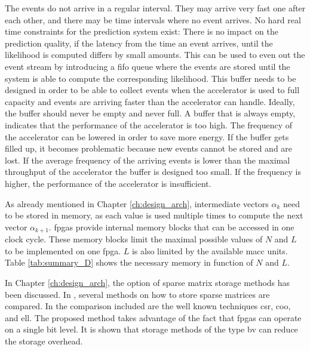 \documentclass[mscthesis]{usiinfthesis}
\begin{document}
The events do not arrive in a regular interval. They may arrive very fast one
after each other, and there may be time intervals where no event arrives. No
hard real time constraints for the prediction system exist: There is no impact
on the prediction quality, if the latency from the time an event arrives, until
the likelihood is computed differs by small amounts. This can be used to even
out the event stream by introducing a \gls{fifo} queue where the events are
stored until the system is able to compute the corresponding likelihood. This
buffer needs to be designed in order to be able to collect events when the
accelerator is used to full capacity and events are arriving faster than the
accelerator can handle. Ideally, the buffer should never be empty and never
full. A buffer that is always empty, indicates that the performance of the
accelerator is too high. The frequency of the accelerator can be lowered in
order to save more energy. If the buffer gets filled up, it becomes
problematic because new events cannot be stored and are lost. If the average
frequency of the arriving events is lower than the maximal throughput of the
accelerator the buffer is designed too small. If the frequency is higher, the
performance of the accelerator is insufficient.

As already mentioned in Chapter \ref{ch:design_arch}, intermediate vectors
$\alpha_k$ need to be stored in memory, as each value is used multiple times to
compute the next vector $\alpha_{k+1}$. \glspl{fpga} provide internal memory
blocks that can be accessed in one clock cycle. These memory blocks limit the
maximal possible values of $N$ and $L$ to be implemented on one \gls{fpga}. $L$
is also limited by the available \gls{macc} units. Table \ref{tab:summary_D}
shows the necessary memory in function of $N$ and $L$.

In Chapter \ref{ch:design_arch}, the option of sparse matrix storage methods
has been discussed. In \cite{FCCM12_Kestur}, several methods on how to store
sparse matrices are compared. In the comparison included are the well known
techniques \gls{csr}, \gls{coo}, and \gls{ell}. The proposed method takes
advantage of the fact that \glspl{fpga} can operate on a single bit level. It
is shown that storage methods of the type \gls{bv} can reduce the storage
overhead.
\end{document}
